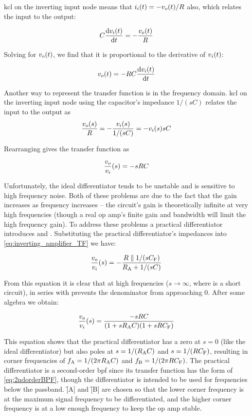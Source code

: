 \ac{kcl} on the inverting input node means that \(\iin(t) = -\vout(t)/R\) also, which relates the input to the output:

\[C\odv{\vin(t)}{t} = -\frac{\vout(t)}{R}\]

Solving for \(\vout(t)\), we find that it is proportional to the derivative of \(\vin(t)\):

\begin{equation}
	\vout(t) = -RC\odv{\vin(t)}{t}
	\label{eq:ideal_differentiator_time}
\end{equation}

Another way to represent the transfer function is in the frequency domain.
\ac{kcl} on the inverting input node using the capacitor's impedance \(1/(sC)\) relates the input to the output as \[\frac{\vout(s)}{R} = -\frac{\vin(s)}{1/(sC)}= -\vin(s)sC\]

Rearranging gives the transfer function as

\begin{equation}
	\frac{\vout}{\vin}(s) = -sRC
	\label{eq:ideal_differentiator_TF}
\end{equation}

Unfortunately, the ideal differentiator tends to be unstable and is sensitive to high frequency noise.
Both of these problems are due to the fact that the gain increases as frequency increases -- the circuit's gain is theoretically infinite at very high frequencies (though a real op amp's finite gain and bandwidth will limit the high frequency gain).
To address these problems a practical differentiator introduces \R[A] and \C[F].
Substituting the practical differentiator's impedances into \eqref{eq:inverting_amplifier_TF} we have:

\[\frac{\vout}{\vin}(s) = -\frac{R \parallel 1/(s\C[F])}{\R[A] + 1/(s\C)}\]

From this equation it is clear that at high frequencies (\(s \to \infty\), where \C is a short circuit), \R[A] in series with \C prevents the denominator from approaching 0.
After some algebra we obtain:

\begin{equation}
	\frac{\vout}{\vin}(s) = \frac{-sRC}{(1 + s\R[A] C)(1 + s R \C[F])}
	\label{eq:practical_differentiator_TF}
\end{equation}

This equation shows that the practical differentiator has a zero at \(s = 0\) (like the ideal differentiator) but also poles at \(s = 1/(\R[A] C)\) and \(s = 1/(R \C[F])\), resulting in corner frequencies of \(\f[A] = 1/(2\pi\R[A] C)\) and \(\f[B] = 1/(2\pi R \C[F])\).
The practical differentiator is a second-order \ac{bpf} since its transfer function has the form of \eqref{eq:2ndorderBPF}, though the differentiator is intended to be used for frequencies below the passband.
\f[A] and \f[B] are chosen so that the lower corner frequency is at the maximum signal frequency to be differentiated, and the higher corner frequency is at a low enough frequency to keep the op amp stable.

